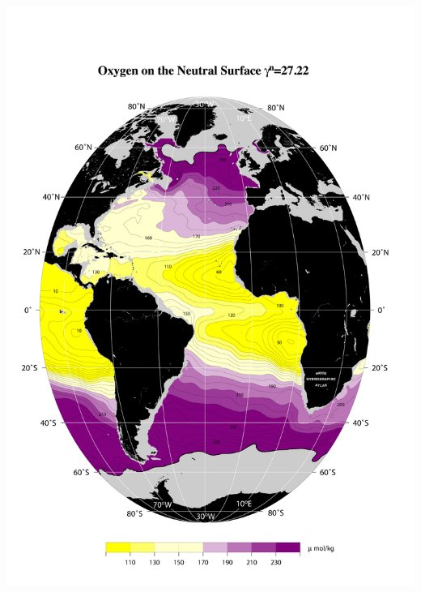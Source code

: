 \documentclass{beamer}
\begin{document}
\begin{frame}[plain,t]
\begin{columns}
\begin{column}{0.5\textwidth}
          \includegraphics[width=\textwidth]{oxygen_isopyc_jpg/gam2722_oxy.jpg}  
      \end{column}
    \end{columns} 
\end{frame}
\end{document}
